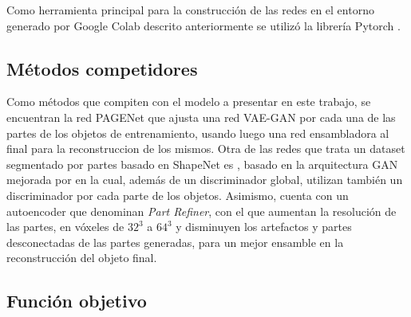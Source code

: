\documentclass[12pt, spanish]{article}
\begin{document}
Como herramienta principal para la construcción de las redes en el entorno
generado por Google Colab descrito anteriormente se utilizó la librería
Pytorch \cite{PytorchNEURIPS2019_9015}.

\subsection{Métodos competidores}%
\label{sub:metodos_competidores}
Como métodos que compiten con el modelo a presentar en este
trabajo, se encuentran la red PAGENet \cite{Li2019} que ajusta una red
VAE-GAN por cada una de las partes de los objetos de entrenamiento,
usando luego una red ensambladora al final para la reconstruccion de
los mismos. Otra de las redes que trata un dataset segmentado por partes
basado en ShapeNet es \cite{G2L18}, basado en la arquitectura GAN mejorada
por \cite{GulrajaniAADC17} en la cual, además de un discriminador global,
utilizan también un discriminador por cada parte de los objetos. Asimismo,
cuenta con un autoencoder que denominan \textit{Part Refiner}, con el que
aumentan la resolución de las partes, en vóxeles de $32^3$ a $64^3$ y
disminuyen los artefactos y partes desconectadas de las partes generadas,
para un mejor ensamble en la reconstrucción del objeto final.

\subsection{Función objetivo}%
\label{sub:funcion_objetivo}
\end{document}

